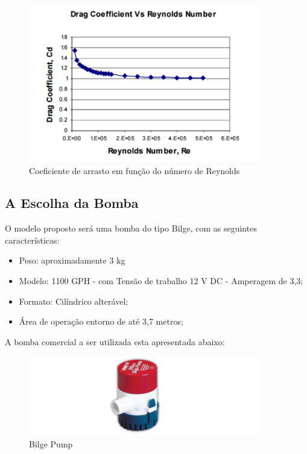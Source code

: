\begin{figure}[h]
  \centering
  \includegraphics[width=0.9\textwidth]{figures/graphic-reynolds.png}
  \caption{Coeficiente de arrasto em função do número de Reynolds \cite{eng2008}}
  \label{fig:graphic-reynolds}
\end{figure}
\FloatBarrier
\par
[APLICANDO A EQ 1.......]

\subsection{A Escolha da Bomba}
O modelo proposto será uma bomba do tipo Bilge, com as seguintes características:
\begin{itemize}
\item Peso: aproximadamente 3 kg
\item Modelo: 1100 GPH - com Tensão de trabalho 12 V DC - Amperagem de 3,3;
\item Formato: Cilíndrico alterável;
\item Área de operação entorno de até 3,7 metros;
\end{itemize}

A bomba comercial a ser utilizada esta apresentada abaixo: 
\par
\begin{figure}[h]
  \centering
  \includegraphics[width=0.9\textwidth]{figures/waterbomb.png}
  \caption{Bilge Pump}
  \label{fig:waterbomb}
\end{figure}
\FloatBarrier
\par

